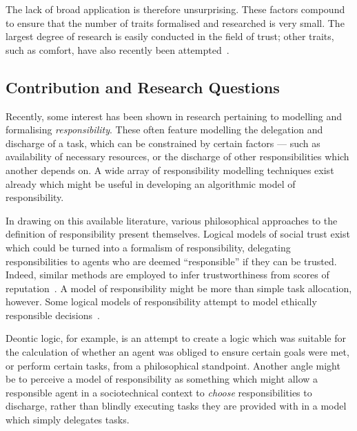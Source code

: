 The lack of broad application is therefore unsurprising. These factors compound to ensure that the number of traits formalised and researched is very small. The largest degree of research is easily conducted in the field of trust; other traits, such as comfort, have also recently been attempted~\cite{marsh2011defining}.\par

\subsection{Contribution and Research Questions}

Recently, some interest has been shown in research pertaining to modelling and formalising \emph{responsibility}\cite{berreby2015modelling,sommerville_dependable_systems_chap_8,Simpson2011}. These often feature modelling the delegation and discharge of a task, which can be constrained by certain factors --- such as availability of necessary resources, or the discharge of other responsibilities which another depends on. A wide array of responsibility modelling techniques exist already which might be useful in developing an algorithmic model of responsibility.\par


In drawing on this available literature, various philosophical approaches to the definition of responsibility present themselves. Logical models of social trust exist which could be turned into a formalism of responsibility, delegating responsibilities to agents who are deemed ``responsible'' if they can be trusted. Indeed, similar methods are employed to infer trustworthiness from scores of reputation~\cite{eigentrust}. A model of responsibility might be more than simple task allocation, however. Some logical models of responsibility attempt to model ethically responsible decisions~\cite{berreby2015modelling}.\par

Deontic logic, for example, is an attempt to create a logic which was suitable for the calculation of whether an agent was obliged to ensure certain goals were met, or perform certain tasks, from a philosophical standpoint. Another angle might be to perceive a model of responsibility as something which might allow a responsible agent in a sociotechnical context to \emph{choose} responsibilities to discharge, rather than blindly executing tasks they are provided with in a model which simply delegates tasks.\par

